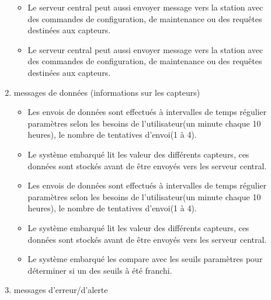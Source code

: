 \documentclass [a4paper] {report}
\begin{document}
\begin{description}
\begin{enumerate}
\begin{itemize}
		\item Le serveur central peut aussi envoyer message vers la station avec des commandes 
		de configuration, de maintenance ou des requêtes destinées aux capteurs.\\
		\item Le serveur central peut aussi envoyer message vers la station avec des commandes de configuration, de maintenance ou des requêtes destinées aux capteurs.\\

		\end{itemize}
	
	\item messages de données (informations sur les capteurs)\\
		\begin{itemize}

		\item Les envois de données sont effectués à intervalles de temps régulier paramètres selon les
		 besoins de l'utilisateur(un minute chaque 10 heures), le nombre de tentatives d'envoi(1 à 4).\\
		\item Le système embarqué lit les valeur des différents capteurs, ces données sont stockés avant 
		de être envoyés vers les serveur central.\\

		\item Les envois de données sont effectués à intervalles de temps régulier paramètres selon les besoins de l'utilisateur(un minute chaque 10 heures), le nombre de tentatives d'envoi(1 à 4).\\
		\item Le système embarqué lit les valeur des différents capteurs, ces données sont stockés avant de être envoyés vers les serveur central.\\

		\item Le système embarqué les compare avec les seuils paramètres pour déterminer si un des seuils à été franchi. \\
		\end{itemize}

	\item messages d'erreur/d'alerte\\
		\begin{itemize}


\end{itemize}
\end{enumerate}
\end{description}
\end{document}
